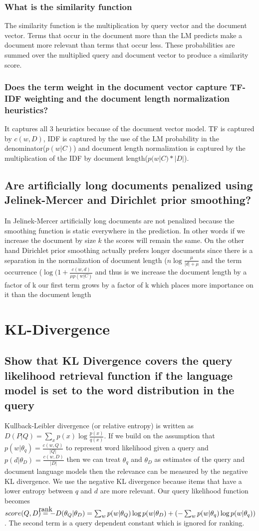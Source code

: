 \documentclass[11pt]{article}
\newcommand\myeq{\stackrel{\mathclap{\normalfont\mbox{rank}}}{=}}
\begin{document}
\subsubsection{What is the similarity function}
The similarity function is the multiplication by query vector and the document vector. Terms that occur in the document more than the LM predicts make a document more relevant than terms that occur less. These probabilities are summed over the multiplied query and document vector to produce a similarity score. 
\subsubsection{Does the term weight in the document vector capture TF-IDF weighting and the document length normalization heuristics?}
It captures all 3 heuristics because of the document vector model. TF is captured by $c(w,D)$, IDF is captured by the use of the LM probability in the denominator($p(w|C)$) and document length normalization is captured by the multiplication of the IDF by document length($p(w|C) * |D|$).
\subsection{Are artificially long documents penalized using Jelinek-Mercer and Dirichlet prior smoothing?}
In Jelinek-Mercer artificially long documents are not penalized because the smoothing function is static everywhere in the prediction. In other words if we increase the document by size $k$ the scores will remain the same. On the other hand Dirichlet prior smoothing actually prefers longer documents since there is a separation in the normalization of document length ($n \log \frac{\mu}{|d| + \mu}$ and the term occurrence ($\log (1+\frac{c(w,d)}{\mu p(w|C)}$ and thus is we increase the document length by a factor of k our first term grows by a factor of k which places more importance on it than the document length
\section{KL-Divergence}
\subsection{Show that KL Divergence covers the query likelihood retrieval function if the language model is set to the word distribution in the query}
Kullback-Leibler divergence (or relative entropy) is written as $D(P | Q) = \sum_x p(x) \log \frac{p(x)}{q(x)}$. If we build on the assumption that $p(w|\theta_q)= \frac{c(w,Q)}{|Q|}$ to represent word likelihood given a query and $p(d|\theta_D) = \frac{c(w,D)}{|D|}$ then we can treat $\theta_q$ and $\theta_D$ as estimates of the query and document language models then the relevance can be measured by the negative KL divergence. We use the negative KL divergence because items that have a lower entropy between $q$ and $d$ are more relevant. Our query likelihood function becomes $score(Q,D) \myeq - D(\theta_Q| \theta_D) = \sum_w p(w|\theta_Q)\log p(w|\theta_D) + (- \sum_w p(w|\theta_q) \log p(w| \theta_q))$. The second term is a query dependent constant which is ignored for ranking.
\end{document}
